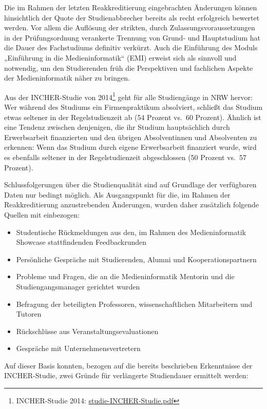 Die im Rahmen der letzten Reakkreditierung eingebrachten Änderungen
können hinsichtlich der Quote der Studienabbrecher bereits als recht
erfolgreich bewertet werden. Vor allem die Auflösung der strikten, durch
Zulassungsvoraussetzungen in der Prüfungsordnung verankerte Trennung von
Grund- und Hauptstudium hat die Dauer des Fachstudiums definitiv
verkürzt. Auch die Einführung des Moduls „Einführung in die
Medieninformatik`` (EMI) erweist sich als sinnvoll und notwendig, um den
Studierenden früh die Perspektiven und fachlichen Aspekte der
Medieninformatik näher zu bringen.

Aus der INCHER-Studie von 2014\footnote{INCHER-Studie 2014:
  \href{https://th-koeln.github.io/mi-2017/anhaenge/studie-INCHER-Studie.pdf}{studie-INCHER-Studie.pdf}}
geht für alle Studiengänge in NRW hervor: Wer während des Studiums ein
Firmenpraktikum absolviert, schließt das Studium etwas seltener in der
Regelstudienzeit ab (54 Prozent vs.~60 Prozent). Ähnlich ist eine
Tendenz zwischen denjenigen, die ihr Studium hauptsächlich durch
Erwerbsarbeit finanzierten und den übrigen Absolventinnen und
Absolventen zu erkennen: Wenn das Studium durch eigene Erwerbsarbeit
finanziert wurde, wird es ebenfalls seltener in der Regelstudienzeit
abgeschlossen (50 Prozent vs.~57 Prozent).

Schlussfolgerungen über die Studienqualität sind auf Grundlage der
verfügbaren Daten nur bedingt möglich. Als Ausgangspunkt für die, im
Rahmen der Reakkreditierung anzustrebenden Änderungen, wurden daher
zusätzlich folgende Quellen mit einbezogen:

\begin{itemize}
\tightlist
\item
  Studentische Rückmeldungen aus den, im Rahmen des Medieninformatik
  Showcase stattfindenden Feedbackrunden
\item
  Persönliche Gespräche mit Studierenden, Alumni und
  Kooperationspartnern
\item
  Probleme und Fragen, die an die Medieninformatik Mentorin und die
  Studiengangsmanager gerichtet wurden
\item
  Befragung der beteiligten Professoren, wissenschaftlichen Mitarbeitern
  und Tutoren
\item
  Rückschlüsse aus Veranstaltungsevaluationen
\item
  Gespräche mit Unternehmensvertretern
\end{itemize}

Auf dieser Basis konnten, bezogen auf die bereits beschrieben
Erkenntnisse der INCHER-Studie, zwei Gründe für verlängerte Studiendauer
ermittelt werden:

